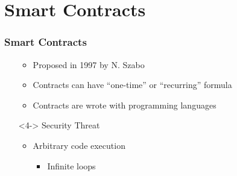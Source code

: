\section{Smart Contracts}
\begin{frame}
  \frametitle{Smart Contracts}

  \begin{itemize}
   \item[]
    \begin{itemize}
      \item<1-> Proposed in 1997 by N. Szabo
      \item<2-> Contracts can have ``one-time'' or ``recurring'' formula
      \item<3-> Contracts are wrote with programming languages
    \end{itemize}

   \item[]<4-> Security Threat
    \begin{itemize}
     \item Arbitrary code execution
     \begin{itemize}
      \item Infinite loops
     \end{itemize}
    \end{itemize}



  \end{itemize}



\end{frame}

